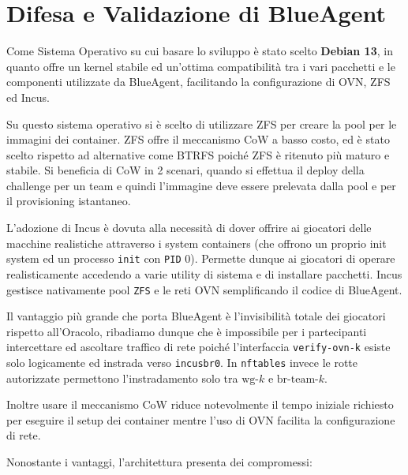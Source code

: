 \section{Difesa e Validazione di
BlueAgent}\label{difesa-e-validazione-di-blueagent}

Come Sistema Operativo su cui basare lo sviluppo è stato scelto
\textbf{Debian 13}, in quanto offre un kernel stabile ed un'ottima
compatibilità tra i vari pacchetti e le componenti utilizzate da
BlueAgent, facilitando la configurazione di OVN, ZFS ed Incus.

Su questo sistema operativo si è scelto di utilizzare ZFS per creare la
pool per le immagini dei container. ZFS offre il meccanismo CoW a basso
costo, ed è stato scelto rispetto ad alternative come BTRFS poiché ZFS è
ritenuto più maturo e stabile. Si beneficia di CoW in 2 scenari, quando
si effettua il deploy della challenge per un team e quindi l'immagine
deve essere prelevata dalla pool e per il provisioning istantaneo.

L'adozione di Incus è dovuta alla necessità di dover offrire ai
giocatori delle macchine realistiche attraverso i system containers (che
offrono un proprio init system ed un processo
\passthrough{\lstinline!init!} con \passthrough{\lstinline!PID!} 0).
Permette dunque ai giocatori di operare realisticamente accedendo a
varie utility di sistema e di installare pacchetti. Incus gestisce
nativamente pool \passthrough{\lstinline!ZFS!} e le reti OVN
semplificando il codice di BlueAgent.

Il vantaggio più grande che porta BlueAgent è l'invisibilità totale dei
giocatori rispetto all'Oracolo, ribadiamo dunque che è impossibile per i
partecipanti intercettare ed ascoltare traffico di rete poiché
l'interfaccia \passthrough{\lstinline!verify-ovn-k!} esiste solo
logicamente ed instrada verso \passthrough{\lstinline!incusbr0!}. In
\passthrough{\lstinline!nftables!} invece le rotte autorizzate
permettono l'instradamento solo tra \(\text{wg-}k\) e
\(\text{br-team-}k\).

Inoltre usare il meccanismo CoW riduce notevolmente il tempo iniziale
richiesto per eseguire il setup dei container mentre l'uso di OVN
facilita la configurazione di rete.

Nonostante i vantaggi, l'architettura presenta dei compromessi:

